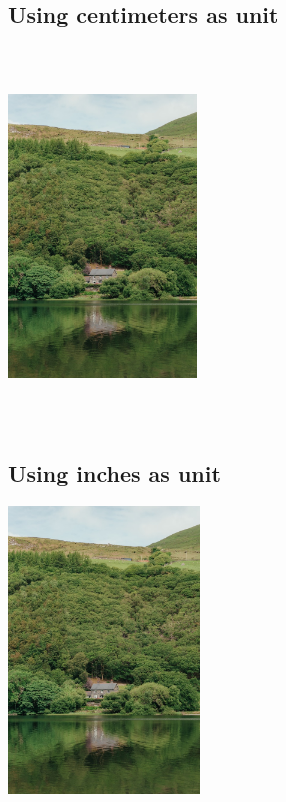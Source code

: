 \documentclass{article}
\begin{document}
\subsection{Using centimeters as unit}
  \includegraphics[width=5cm, height=10cm]{shawnanggg-SQ9Q1nvwhlI-unsplash.jpg}

\subsection{Using inches as unit}
  \includegraphics[width=2in]{shawnanggg-SQ9Q1nvwhlI-unsplash.jpg}
\end{document}
